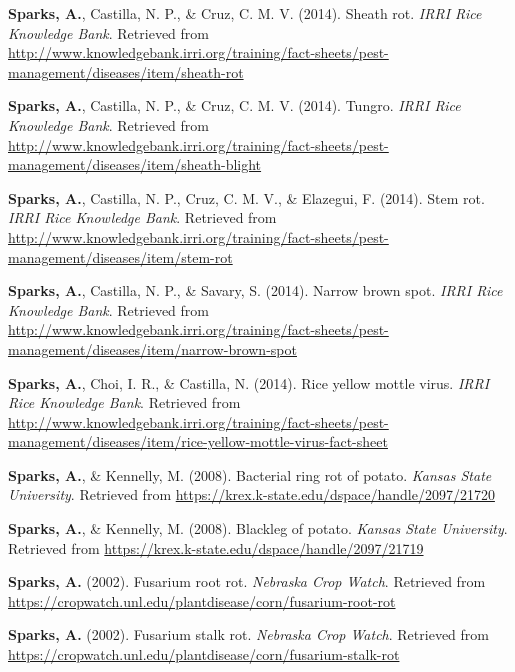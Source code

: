 \documentclass[11pt, a4paper]{awesome-cv}
\begin{document}
\leavevmode\hypertarget{ref-Sparks2014g}{}%
\textbf{Sparks, A.}, Castilla, N. P., \& Cruz, C. M. V. (2014). Sheath rot. \emph{IRRI Rice Knowledge Bank}. Retrieved from \url{http://www.knowledgebank.irri.org/training/fact-sheets/pest-management/diseases/item/sheath-rot}

\leavevmode\hypertarget{ref-Sparks2014d}{}%
\textbf{Sparks, A.}, Castilla, N. P., \& Cruz, C. M. V. (2014). Tungro. \emph{IRRI Rice Knowledge Bank}. Retrieved from \url{http://www.knowledgebank.irri.org/training/fact-sheets/pest-management/diseases/item/sheath-blight}

\leavevmode\hypertarget{ref-Sparks2014h}{}%
\textbf{Sparks, A.}, Castilla, N. P., Cruz, C. M. V., \& Elazegui, F. (2014). Stem rot. \emph{IRRI Rice Knowledge Bank}. Retrieved from \url{http://www.knowledgebank.irri.org/training/fact-sheets/pest-management/diseases/item/stem-rot}

\leavevmode\hypertarget{ref-Sparks2014f}{}%
\textbf{Sparks, A.}, Castilla, N. P., \& Savary, S. (2014). Narrow brown spot. \emph{IRRI Rice Knowledge Bank}. Retrieved from \url{http://www.knowledgebank.irri.org/training/fact-sheets/pest-management/diseases/item/narrow-brown-spot}

\leavevmode\hypertarget{ref-Sparks2014i}{}%
\textbf{Sparks, A.}, Choi, I. R., \& Castilla, N. (2014). Rice yellow mottle virus. \emph{IRRI Rice Knowledge Bank}. Retrieved from \url{http://www.knowledgebank.irri.org/training/fact-sheets/pest-management/diseases/item/rice-yellow-mottle-virus-fact-sheet}

\leavevmode\hypertarget{ref-Sparks2008a}{}%
\textbf{Sparks, A.}, \& Kennelly, M. (2008). Bacterial ring rot of potato. \emph{Kansas State University}. Retrieved from \url{https://krex.k-state.edu/dspace/handle/2097/21720}

\leavevmode\hypertarget{ref-Sparks2008b}{}%
\textbf{Sparks, A.}, \& Kennelly, M. (2008). Blackleg of potato. \emph{Kansas State University}. Retrieved from \url{https://krex.k-state.edu/dspace/handle/2097/21719}

\leavevmode\hypertarget{ref-Sparks2002b}{}%
\textbf{Sparks, A.} (2002). Fusarium root rot. \emph{Nebraska Crop Watch}. Retrieved from \url{https://cropwatch.unl.edu/plantdisease/corn/fusarium-root-rot}

\leavevmode\hypertarget{ref-Sparks2002a}{}%
\textbf{Sparks, A.} (2002). Fusarium stalk rot. \emph{Nebraska Crop Watch}. Retrieved from \url{https://cropwatch.unl.edu/plantdisease/corn/fusarium-stalk-rot}
\end{document}
